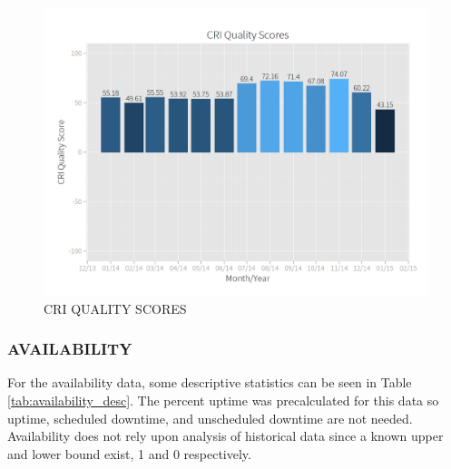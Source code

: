 \documentclass[SDSUThesis.tex]{subfiles}
\begin{document}
            \begin{figure}[ht]
                \centering
                \includegraphics[scale=.3]{images/quality_scores.png}
                \caption{CRI QUALITY SCORES}
                \label{fig:quality-scores}
            \end{figure}
            
            
            
            
        \subsubsection{AVAILABILITY}
            For the availability data,
            some descriptive statistics can be seen in 
            Table \ref{tab:availability_desc}.  The percent uptime
            was precalculated for this data so uptime, scheduled downtime,
            and unscheduled downtime are not needed.  Availability
            does not rely upon analysis of historical data since
            a known upper and lower bound exist, 1 and 0 respectively.
            
\end{document}
